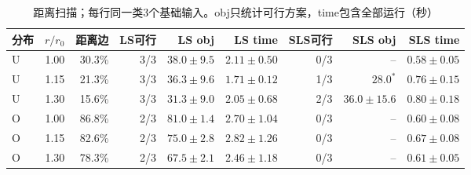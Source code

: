 \begin{table}[htbp]
\centering\footnotesize
\caption{距离扫描；每行同一类3个基础输入。obj只统计可行方案，time包含全部运行（秒）}\label{tab:radius-results}
\begin{tabular}{lrrrrrrrr}\toprule
分布 & $r/r_0$ & 距离边 & LS可行 & LS obj & LS time & SLS可行 & SLS obj & SLS time \\\midrule
U & 1.00 & 30.3\% & 3/3 & $38.0\pm9.5$ & $2.11\pm0.50$ & 0/3 & -- & $0.58\pm0.05$ \\
U & 1.15 & 21.3\% & 3/3 & $36.3\pm9.6$ & $1.71\pm0.12$ & 1/3 & $28.0^{*}$ & $0.76\pm0.15$ \\
U & 1.30 & 15.6\% & 3/3 & $31.3\pm9.0$ & $2.05\pm0.68$ & 2/3 & $36.0\pm15.6$ & $0.80\pm0.18$ \\
O & 1.00 & 86.8\% & 2/3 & $81.0\pm1.4$ & $2.70\pm1.04$ & 0/3 & -- & $0.60\pm0.08$ \\
O & 1.15 & 82.6\% & 2/3 & $75.0\pm2.8$ & $2.82\pm1.26$ & 0/3 & -- & $0.67\pm0.08$ \\
O & 1.30 & 78.3\% & 2/3 & $67.5\pm2.1$ & $2.46\pm1.18$ & 0/3 & -- & $0.61\pm0.05$ \\
\bottomrule\end{tabular}
\end{table}
